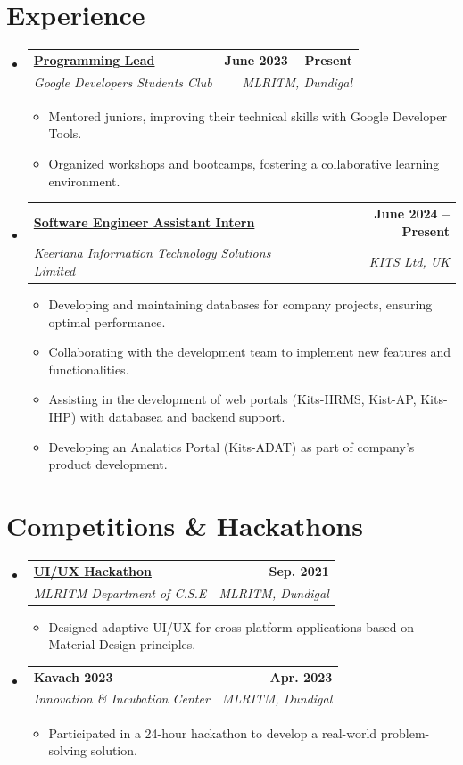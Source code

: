 \documentclass[a4paper,11pt]{article}
\makeatletter
\newcommand{\resumeItem}[1]{
  \item\small{
    {#1 \vspace{-2pt}}
  }
}
\newcommand{\resumeSubheading}[4]{
  \vspace{-2pt}\item
    \begin{tabular*}{0.97\textwidth}[t]{l@{\extracolsep{\fill}}r}
      \textbf{#1} & \textbf{\small #2} \\
      \textit{\small#3} & \textit{\small #4} \\
    \end{tabular*}\vspace{-7pt}
}
\newcommand{\resumeSubHeadingListStart}{\begin{itemize}[leftmargin=0.15in, label={}]}
\newcommand{\resumeSubHeadingListEnd}{\end{itemize}}
\newcommand{\resumeItemListStart}{\begin{itemize}}
\newcommand{\resumeItemListEnd}{\end{itemize}\vspace{-5pt}}
\makeatother
\begin{document}
\section{Experience}
    \resumeSubHeadingListStart
        \resumeSubheading
            {\href{https://g.dev/tsrinu2003}{Programming Lead}}{June 2023 -- Present}
            {Google Developers Students Club}{MLRITM, Dundigal}
            \resumeItemListStart
                \resumeItem{Mentored juniors, improving their technical skills with Google Developer Tools.}
                \resumeItem{Organized workshops and bootcamps, fostering a collaborative learning environment.}
        \resumeItemListEnd
        \resumeSubheading
            {\href{http://kitsltd.co.uk/index.html}{Software Engineer Assistant Intern}}{June 2024 -- Present}
            {Keertana Information Technology Solutions Limited}{KITS Ltd, UK}
            \resumeItemListStart
                \resumeItem{Developing and maintaining databases for company projects, ensuring optimal performance.}
                \resumeItem{Collaborating with the development team to implement new features and functionalities.}
                \resumeItem{Assisting in the development of web portals (Kits-HRMS, Kist-AP, Kits-IHP) with databasea and backend support.}
                \resumeItem{Developing an Analatics Portal (Kits-ADAT) as part of company's product development.}
        \resumeItemListEnd
    \resumeSubHeadingListEnd

\section{Competitions \& Hackathons}
    \resumeSubHeadingListStart
        \resumeSubheading
            {\href{https://drive.google.com/file/d/1M_5k71Pplh6leoRYhYY6SjMcuziMO_Cd/view?usp=sharing}{UI/UX Hackathon}}{Sep. 2021}
            {MLRITM Department of C.S.E}{MLRITM, Dundigal}
            \resumeItemListStart
                \resumeItem{Designed adaptive UI/UX for cross-platform applications based on Material Design principles.}
        \resumeItemListEnd

        \resumeSubheading
            {Kavach 2023}{Apr. 2023}
            {Innovation \& Incubation Center}{MLRITM, Dundigal}
            \resumeItemListStart
                \resumeItem{Participated in a 24-hour hackathon to develop a real-world problem-solving solution.}
        \resumeItemListEnd
    \resumeSubHeadingListEnd
\end{document}
